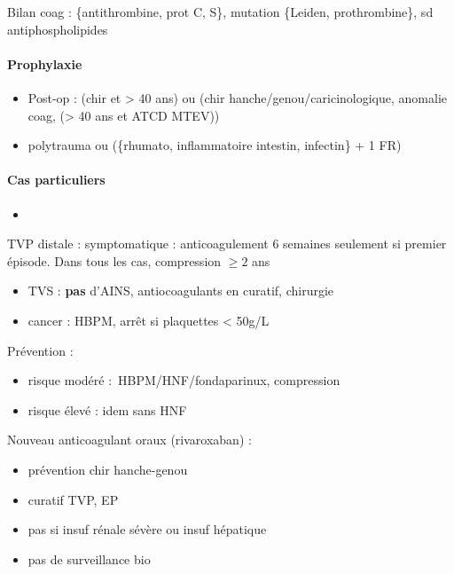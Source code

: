 \documentclass[11pt]{article}
\begin{document}
Bilan coag : \{antithrombine, prot C, S\}, mutation \{Leiden, prothrombine\}, sd
antiphospholipides

\paragraph{Prophylaxie}
\label{sec:org6769c2c}

\begin{itemize}
\item Post-op : (chir et > 40 ans) ou (chir hanche/genou/caricinologique, anomalie
coag, (> 40 ans et ATCD MTEV))
\item polytrauma ou (\{rhumato, inflammatoire intestin, infectin\} + 1 FR)
\end{itemize}



\paragraph{Cas particuliers}
\label{sec:org5fad299}

\begin{itemize}
\item 
\end{itemize}
TVP distale : symptomatique : anticoagulement 6 semaines seulement si premier épisode. Dans tous les cas,
compression \(\ge 2\) ans
\begin{itemize}
\item \gls{TVS} : \textbf{pas} d'AINS, antiocoagulants en curatif, chirurgie
\item cancer : HBPM, arrêt si plaquettes < 50g/L
\end{itemize}

Prévention : 

\begin{itemize}
\item risque modéré : HBPM/HNF/fondaparinux, compression
\item risque élevé : idem sans HNF
\end{itemize}


Nouveau anticoagulant oraux (rivaroxaban) :

\begin{itemize}
\item prévention chir hanche-genou
\item curatif TVP, EP
\item pas si insuf rénale sévère ou insuf hépatique
\item pas de surveillance bio
\end{itemize}
\end{document}

